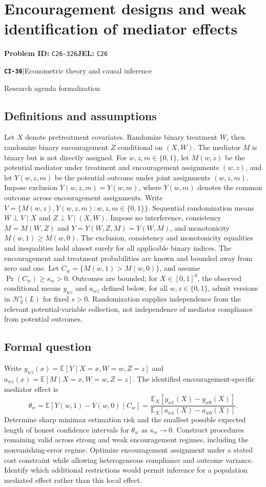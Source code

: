 \documentclass[11pt,a4paper]{article}
\newcommand{\E}{\mathbb E}
\newcommand{\entrymeta}[3]{{\sffamily\small\color{muted}\textbf{\texttt{#1}}\quad|\quad #2\par #3\par}}
\begin{document}
\section*{Encouragement designs and weak identification of mediator effects}
\textbf{Problem ID:} \texttt{C26-326}\quad \textbf{JEL:} \texttt{C26}\par
\label{problem:OP-0515}
\label{beyond:CI-36}
\entrymeta{CI-36}{Econometric theory and causal inference}{Research agenda formalization}
\subsection*{Definitions and assumptions}
Let $X$ denote pretreatment covariates. Randomize binary treatment $W$, then randomize binary encouragement $Z$ conditional on $(X,W)$. The mediator $M$ is binary but is not directly assigned. For $w,z,m\in\{0,1\}$, let $M(w,z)$ be the potential mediator under treatment and encouragement assignments $(w,z)$, and let $Y(w,z,m)$ be the potential outcome under joint assignments $(w,z,m)$. Impose exclusion $Y(w,z,m)=Y(w,m)$, where $Y(w,m)$ denotes the common outcome across encouragement assignments. Write $V=\{M(w,z),Y(w,z,m):w,z,m\in\{0,1\}\}$. Sequential randomization means $W\perp V\mid X$ and $Z\perp V\mid(X,W)$. Impose no interference, consistency $M=M(W,Z)$ and $Y=Y(W,Z,M)=Y(W,M)$, and monotonicity $M(w,1)\geq M(w,0)$. The exclusion, consistency and monotonicity equalities and inequalities hold almost surely for all applicable binary indices. The encouragement and treatment probabilities are known and bounded away from zero and one. Let $C_w=\{M(w,1)>M(w,0)\}$, and assume $\Pr(C_w)\geq\kappa_n>0$. Outcomes are bounded; for $X\in[0,1]^d$, the observed conditional means $y_{wz}$ and $a_{wz}$ defined below, for all $w,z\in\{0,1\}$, admit versions in $\mathcal H_d^s(L)$ for fixed $s>0$. Randomization supplies independence from the relevant potential-variable collection, not independence of mediator compliance from potential outcomes.
\subsection*{Formal question}
Write $y_{wz}(x)=\E[Y\mid X=x,W=w,Z=z]$ and $a_{wz}(x)=\E[M\mid X=x,W=w,Z=z]$. The identified encouragement-specific mediator effect is
\[
 \theta_w=\E[Y(w,1)-Y(w,0)\mid C_w]
 =\frac{\E_X[y_{w1}(X)-y_{w0}(X)]}{\E_X[a_{w1}(X)-a_{w0}(X)]}.
\]
Determine sharp minimax estimation risk and the smallest possible expected length of honest confidence intervals for $\theta_w$ as $\kappa_n\to0$. Construct procedures remaining valid across strong and weak encouragement regimes, including the nonvanishing-error regime. Optimize encouragement assignment under a stated cost constraint while allowing heterogeneous compliance and outcome variance. Identify which additional restrictions would permit inference for a population mediated effect rather than this local effect.
\end{document}
